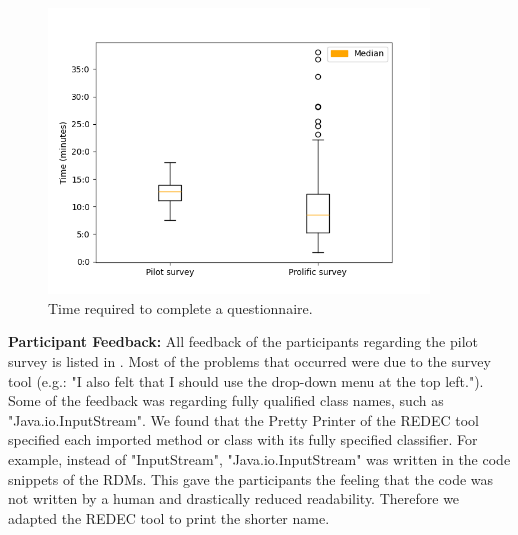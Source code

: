\documentclass[%
class=scrreprt,
chapterprefix=false,%
open=right,%
twoside=false,%
paper=a4,%
logofile={Logo\_zentral\_farbig\_EN.png},%
thesistype=master,%
UKenglish,%
]{se2thesis}
\theoremstyle{definition}
\newcommand{\rdh}{REDEC\xspace}
\newcommand{\rdhs}{RDMs\xspace}
\begin{document}
	\begin{figure}[tb]
		\centering
		\includegraphics[width=0.9\textwidth]{img/survey_times.png}
		\caption{Time required to complete a questionnaire.}
		\label{fig:survey_times}
	\end{figure}
		
	\textbf{Participant Feedback:}
	All feedback of the participants regarding the pilot survey is listed in .
	Most of the problems that occurred were due to the survey tool (e.g.: "I also felt that I should use the drop-down menu at the top left.").
	Some of the feedback was regarding fully qualified class names, such as "Java.io.InputStream". We found that the Pretty Printer of the \rdh tool specified each imported method or class with its fully specified classifier. For example, instead of "InputStream", "Java.io.InputStream" was written in the code snippets of the \rdhs. This gave the participants the feeling that the code was not written by a human and drastically reduced readability. Therefore we adapted the \rdh tool to print the shorter name.
	
\end{document}
